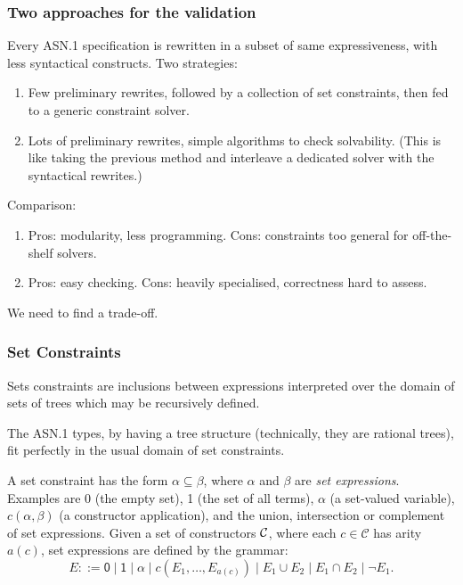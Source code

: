 \documentclass[compress,dvips,xcolor={dvipsnames},t]{beamer}
\newcommand\ASN{\textsf{ASN.1}\xspace}
\begin{document}
\begin{frame}
\frametitle{Two approaches for the validation}

Every \ASN specification is rewritten in a subset of same
expressiveness, with less syntactical constructs. Two strategies:
\begin{enumerate}

  \item Few preliminary rewrites, followed by a collection of set
  constraints, then fed to a generic constraint solver.

  \item Lots of preliminary rewrites, simple algorithms to check
    solvability. (This is like taking the previous method and
    interleave a dedicated solver with the syntactical rewrites.)

\end{enumerate}
Comparison:
\begin{enumerate}

\item Pros: modularity, less programming. Cons: constraints too
  general for off-the-shelf solvers.

  \item Pros: easy checking. Cons: heavily specialised, correctness
    hard to assess.

\end{enumerate}
We need to find a trade-off.

\end{frame}

\begin{frame}
\frametitle{Set Constraints}

Sets constraints are inclusions between expressions interpreted over
the domain of sets of trees which may be recursively defined.

\medskip

The \ASN types, by having a tree structure (technically, they are
rational trees), fit perfectly in the usual domain of set
constraints.

\medskip


A set constraint has the form $\alpha \subseteq \beta$, where $\alpha$
and $\beta$ are \emph{set expressions}. Examples are \textsf{0} (the
empty set), \textsf{1} (the set of all terms), $\alpha$ (a set-valued
variable), $c(\alpha, \beta)$ (a constructor application), and the
union, intersection or complement of set expressions. Given a set of
constructors ${\cal C}$, where each $c \in \mathcal{C}$ has arity
$a(c)$, set expressions are defined by the grammar:
\begin{equation*}
E ::= \textsf{0} \mid \textsf{1} \mid \alpha \mid c (E_1, \ldots,
E_{a(c)}) \mid E_1 \cup E_2 \mid E_1 \cap E_2 \mid \neg E_1.
\end{equation*}

\end{frame}
\end{document}
